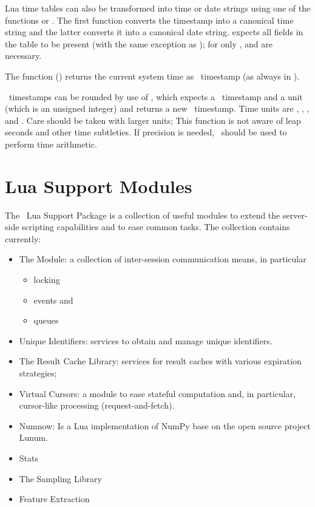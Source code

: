 Lua time tables can also be transformed into time or date
strings using one of the functions
 or
.
The first function converts the timestamp
into a canonical time string and the latter
converts it into a canonical date string.
 expects all fields in the
table to be present (with the same exception
as );
for  only ,
 and  are necessary.

The function () returns
the current system time as \nowdb\ timestamp
(as always in ).

\nowdb\ timestamps can be rounded by use of
, which expects a \nowdb\ timestamp
and a unit (which is an unsigned integer)
and returns a new \nowdb\ timestamp.
Time units are
,
,
,
 and
.
Care should be taken with larger units;
This function is not aware of leap seconds
and other time subtleties. If precision is needed,
\sql\ should be used to perform time arithmetic.

\section{Lua Support Modules}\label{sec_luasupp}
The \nowdb\ Lua Support Package is a collection
of useful modules to extend the server-side
scripting capabilities and to ease common tasks.
The collection contains currently:

\begin{itemize}
\item The  Module:
      a collection of inter-session
      communication means, in particular
      \begin{itemize} 
      \item locking
      \item events and
      \item queues
      \end{itemize} 
\item Unique Identifiers:
      services to obtain and manage unique identifiers.

\item The Result Cache Library:
      services for result caches with various
      expiration strategies;

\item Virtual Cursors:
      a module to ease stateful computation and,
      in particular, cursor-like processing (request-and-fetch).
       
\item Numnow:
      Is a Lua implementation of NumPy
      base on the open source project Lunum.
\item Stats
\item The Sampling Library
\item Feature Extraction
\end{itemize}

